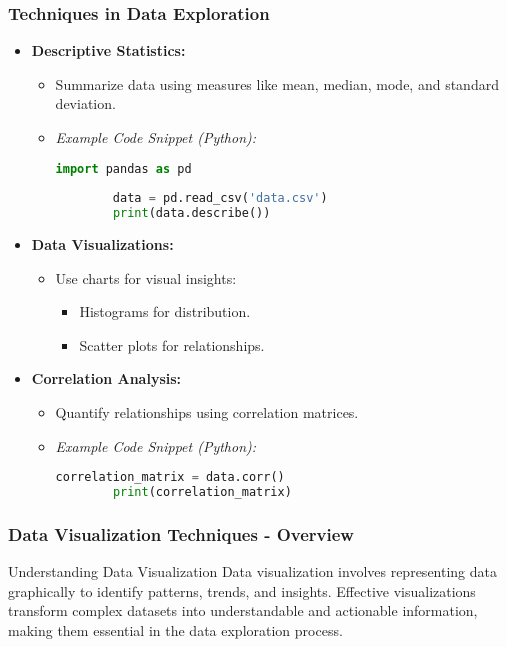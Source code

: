 \documentclass[aspectratio=169]{beamer}
\begin{document}
\begin{frame}[fragile]
  \frametitle{Techniques in Data Exploration}
  \begin{itemize}
    \item \textbf{Descriptive Statistics:}
      \begin{itemize}
        \item Summarize data using measures like mean, median, mode, and standard deviation.
        \item \textit{Example Code Snippet (Python):}
        \begin{lstlisting}[language=Python]
        import pandas as pd
        
        data = pd.read_csv('data.csv')
        print(data.describe())
        \end{lstlisting}
      \end{itemize}
    
    \item \textbf{Data Visualizations:}
      \begin{itemize}
        \item Use charts for visual insights: 
          \begin{itemize}
            \item Histograms for distribution.
            \item Scatter plots for relationships.
          \end{itemize}
      \end{itemize}
    
    \item \textbf{Correlation Analysis:}
      \begin{itemize}
        \item Quantify relationships using correlation matrices.
        \item \textit{Example Code Snippet (Python):}
        \begin{lstlisting}[language=Python]
        correlation_matrix = data.corr()
        print(correlation_matrix)
        \end{lstlisting}
      \end{itemize}
  \end{itemize}
\end{frame}

\begin{frame}[fragile]
  \frametitle{Data Visualization Techniques - Overview}
  \begin{block}{Understanding Data Visualization}
    Data visualization involves representing data graphically to identify patterns, trends, and insights. 
    Effective visualizations transform complex datasets into understandable and actionable information, making them essential in the data exploration process.
  \end{block}
\end{frame}
\end{document}
